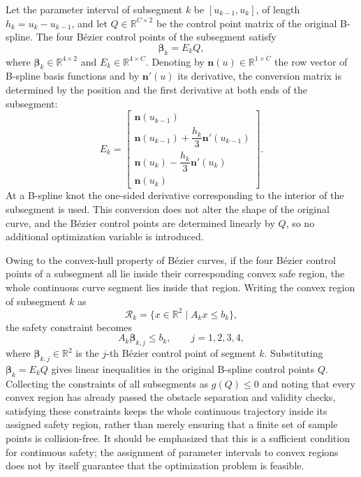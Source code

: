 \documentclass[journal]{IEEEtran}
\newcommand{\R}{\mathbb{R}}
\begin{document}
Let the parameter interval of subsegment $k$ be $[u_{k-1},u_k]$, of length
$h_k=u_k-u_{k-1}$, and let $Q\in\R^{C\times2}$ be the control point matrix of
the original B-spline. The four B\'ezier control points of the subsegment
satisfy
\begin{equation}
\bm\beta_k=E_kQ,
\end{equation}
where $\bm\beta_k\in\R^{4\times2}$ and $E_k\in\R^{4\times C}$. Denoting by
$\mathbf n(u)\in\R^{1\times C}$ the row vector of B-spline basis functions and
by $\mathbf n'(u)$ its derivative, the conversion matrix is determined by the
position and the first derivative at both ends of the subsegment:
\begin{equation}
E_k=
\begin{bmatrix}
\mathbf n(u_{k-1})\\[2pt]
\mathbf n(u_{k-1})+\dfrac{h_k}{3}\mathbf n'(u_{k-1})\\[4pt]
\mathbf n(u_k)-\dfrac{h_k}{3}\mathbf n'(u_k)\\[4pt]
\mathbf n(u_k)
\end{bmatrix}.
\end{equation}
At a B-spline knot the one-sided derivative corresponding to the interior of the
subsegment is used. This conversion does not alter the shape of the original
curve, and the B\'ezier control points are determined linearly by $Q$, so no
additional optimization variable is introduced.

Owing to the convex-hull property of B\'ezier curves, if the four B\'ezier
control points of a subsegment all lie inside their corresponding convex safe
region, the whole continuous curve segment lies inside that region. Writing the
convex region of subsegment $k$ as
\begin{equation}
\mathcal R_k=\{x\in\R^2\mid A_kx\leq b_k\},
\end{equation}
the safety constraint becomes
\begin{equation}
A_k\bm\beta_{k,j}\leq b_k,\qquad j=1,2,3,4,
\end{equation}
where $\bm\beta_{k,j}\in\R^2$ is the $j$-th B\'ezier control point of segment
$k$. Substituting $\bm\beta_k=E_kQ$ gives linear inequalities in the original
B-spline control points $Q$. Collecting the constraints of all subsegments as
$g(Q)\leq0$ and noting that every convex region has already passed the obstacle
separation and validity checks, satisfying these constraints keeps the whole
continuous trajectory inside its assigned safety region, rather than merely
ensuring that a finite set of sample points is collision-free. It should be
emphasized that this is a sufficient condition for continuous safety; the
assignment of parameter intervals to convex regions does not by itself
guarantee that the optimization problem is feasible.
\end{document}
